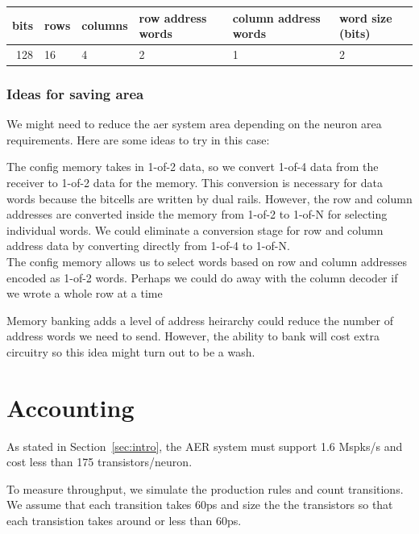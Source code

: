 \documentclass{article}
\begin{document}
\begin{center}
    \begin{tabular}{|r|l|l|l|l|l|}
    \hline
    bits & rows & columns & row address words & column address words & word size (bits) \\ \hline
    128 & 16 & 4 & 2 & 1 & 2 \\ \hline
    \end{tabular}
\end{center}

\subsubsection*{Ideas for saving area}

We might need to reduce the aer system area depending on the neuron area
requirements. Here are some ideas to try in this case:

\noindent
The config memory takes in 1-of-2 data, so we convert 1-of-4 data from the
receiver to 1-of-2 data for the memory.
This conversion is necessary for data words because the bitcells
are written by dual rails.
However, the row and column addresses are converted inside the memory
from 1-of-2 to 1-of-N for selecting individual words. We could
eliminate a conversion stage for row and column address data by converting
directly from 1-of-4 to 1-of-N. \\

\noindent
The config memory allows us to select words based on row and column addresses
encoded as 1-of-2 words. Perhaps we could do away with the column decoder if
we wrote a whole row at a time

\noindent
Memory banking adds a level of address heirarchy could reduce
the number of address words we need to send. However, the ability to bank
will cost extra circuitry so this idea might turn out to be a wash. \\

\section{Accounting \label{sec:accounting}}

As stated in Section~\ref{sec:intro}, the AER system must support 1.6 Mspks/s
and cost less than 175 transistors/neuron.

To measure throughput, we simulate the production rules and count transitions.
We assume that each transition takes 60ps and size the the transistors so that
each transistion takes around or less than 60ps.
\end{document}
